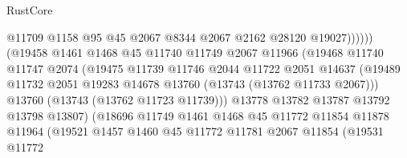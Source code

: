\begin{lexlean}{RustCore}
\begin{coremodule}
                                        @11709
                                        @1158
                                        @95
                                        @45
                                        @2067
                                        @8344
                                        @2067
                                        @2162
                                        @28120
                                        @19027))))))
                            (@19458
                              @1461
                              @1468
                              @45
                              @11740
                              @11749
                              @2067
                              @11966
                              (@19468
                                @11740
                                @11747
                                @2074
                                (@19475
                                  @11739
                                  @11746
                                  @2044
                                  @11722
                                  @2051
                                  @14637
                                  (@19489
                                    @11732
                                    @2051
                                    @19283
                                    @14678
                                    @13760
                                    (@13743 (@13762 @11733 @2067)))
                                  @13760
                                  (@13743 (@13762 @11723 @11739)))
                                @13778
                                @13782
                                @13787
                                @13792
                                @13798
                                @13807)
                              (@18696
                                @11749
                                @1461
                                @1468
                                @45
                                @11772
                                @11854
                                @11878
                                @11964
                                (@19521
                                  @1457
                                  @1460
                                  @45
                                  @11772
                                  @11781
                                  @2067
                                  @11854
                                  (@19531
                                    @11772

\end{coremodule}
\end{lexlean}
